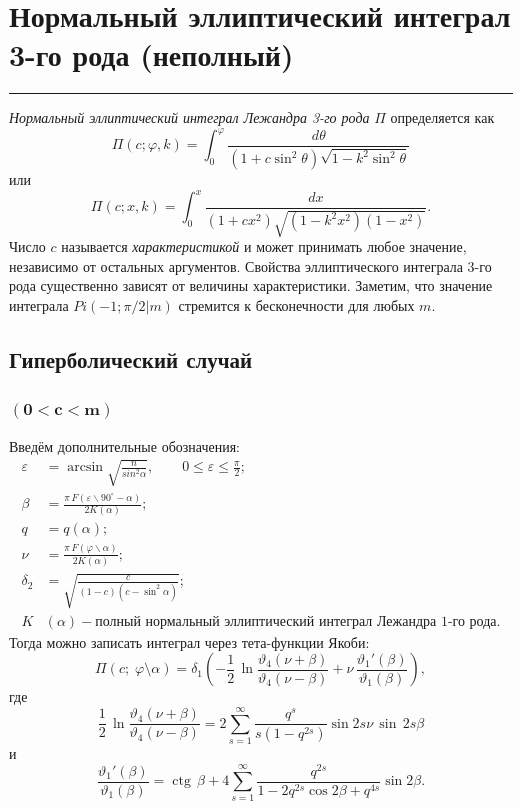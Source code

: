\documentclass[fleqn]{article}
\begin{document}
	\section{Нормальный эллиптический интеграл 3-го рода (неполный)}
	\hrule
	\emph{Нормальный эллиптический интеграл Лежандра 3-го рода} $\Pi$ определяется как
	\begin{equation*}\Pi(c;\varphi, k)=\int_0^\varphi \frac{d\theta}{(1+c\sin^2\theta)\sqrt{1-k^2\sin^2\theta}}\end{equation*}
	или
	\begin{equation*}\Pi(c;x,k)=\int_0^x\frac{dx}{(1+cx^2)\sqrt{(1-k^2x^2)(1-x^2)}}.\end{equation*}
	Число $c$ называется \emph{характеристикой} и может принимать любое значение, независимо от остальных аргументов. Свойства эллиптического интеграла 3-го рода существенно зависят от величины характеристики. Заметим, что значение интеграла $Pi(-1;\pi/2|m)$ стремится к бесконечности для любых $m$.
	\subsection{Гиперболический случай}
	\subsubsection{$\mathbf{(0<c<m)}$}
	Введём дополнительные обозначения:
	\begin{align*}
		\varepsilon& = \arcsin\sqrt{\frac{n}{sin^2\alpha}},\qquad 0\leqslant\varepsilon\leqslant\frac{\pi}{2}; \\
		\beta& = \frac{\pi\,F(\varepsilon \backslash 90^\circ - \alpha)}{2K(\alpha)}; \\
		q&=q(\alpha); \\
		\nu&=\frac{\pi\,F(\varphi\backslash\alpha)}{2K(\alpha)}; \\
		\delta_2&=\sqrt{\frac{c}{(1-c)(c-\sin^2\alpha)}};\\
		K&(\alpha) - \text{полный нормальный эллиптический интеграл Лежандра 1-го рода.}
	\end{align*}
	Тогда можно записать интеграл через тета-функции Якоби:
	\begin{equation*}\Pi(c;\;\varphi \setminus \alpha )=\delta _{1}\left(-{\frac {1}{2}}\,\ln {\frac {\vartheta _{4}(\nu +\beta )}{\vartheta _{4}(\nu -\beta )}}+\nu \,{\frac {\vartheta _{1}'(\beta )}{\vartheta _{1}(\beta )}}\right),\end{equation*}
	где
	\begin{equation*}\frac{1}{2}\,\ln\frac{\vartheta_4(\nu+\beta)}{\vartheta_4(\nu-\beta)} = 2 \sum_{s=1}^{\infty} \frac{q^s}{s(1-q^{2s})}\sin{2s\nu}\,\sin\,{2s\beta}\end{equation*}
	и
	\begin{equation*}{\frac {\vartheta _{1}'(\beta )}{\vartheta _{1}(\beta )}}=\operatorname {ctg} \,\beta +4\sum _{s=1}^{\infty }{\frac {q^{2s}}{1-2q^{2s}\cos {2\beta }+q^{4s}}}\sin {2\beta }.\end{equation*}
\end{document}
